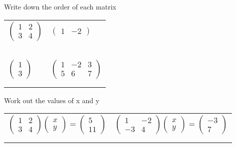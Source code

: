 \documentclass[fontsize=20pt]{scrartcl}
\begin{document}
\newpage
Write down the order of each matrix
\newline
\newline
\begin{tabular}{p{13cm}p{13cm}}
$\begin{pmatrix}1&2\\3&4 \end{pmatrix}$
&$\begin{pmatrix}1&-2 \end{pmatrix}$
\\\\\\
\\\\\\

$\begin{pmatrix}1\\3 \end{pmatrix}$
&$\begin{pmatrix}1&-2&3\\5&6&7 \end{pmatrix}$
\\\\\\
\end{tabular}
\newpage
Work out the values of x and y
\newline
\newline
\begin{tabular}{p{13cm}p{13cm}}
$\begin{pmatrix}1&2\\3&4\end{pmatrix}\begin{pmatrix}x\\y\end{pmatrix}=\begin{pmatrix}5\\11\end{pmatrix}$
&$\begin{pmatrix}1&-2\\-3&4\end{pmatrix}\begin{pmatrix}x\\y\end{pmatrix}=\begin{pmatrix}-3\\7\end{pmatrix}$
\\\\\\
\end{tabular}
\end{document}
